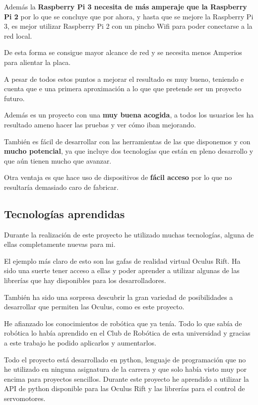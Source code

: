 \documentclass[twoside, 11pt]{epstfg}
\begin{document}
Además la \textbf{Raspberry Pi 3 necesita de más amperaje que la Raspberry Pi 2} por lo que se concluye que por ahora, y hasta que se mejore la Raspberry Pi 3, es mejor utilizar Raspberry Pi 2 con un pincho Wifi para poder conectarse a la red local.

De esta forma se consigue mayor alcance de red y se necesita menos Amperios para alientar la placa.

A pesar de todos estos puntos a mejorar el resultado es muy bueno, teniendo e cuenta que e una primera aproximación a lo que que pretende ser un proyecto futuro.

Además es un proyecto con una \textbf{muy buena acogida}, a todos los usuarios les ha resultado ameno hacer las pruebas y ver cómo iban mejorando.

También es fácil de desarrollar con las herramientas de las que disponemos y con \textbf{mucho potencial}, ya que incluye dos tecnologías que están en pleno desarrollo y que aún tienen mucho que avanzar.

Otra ventaja es que hace uso de dispositivos de \textbf{fácil acceso} por lo que no resultaría demasiado caro de fabricar.

\subsection{Tecnologías aprendidas}

Durante la realización de este proyecto he utilizado muchas tecnologías, alguna de ellas completamente nuevas para mi.

El ejemplo más claro de esto son las gafas de realidad virtual Oculus Rift. Ha sido una suerte tener acceso a ellas y poder aprender a utilizar algunas de las librerías que hay disponibles para los desarrolladores.

También ha sido una sorpresa descubrir la gran variedad de posibilidades a desarrollar que permiten las Oculus, como es este proyecto.

He afianzado los conocimientos de robótica que ya tenía. Todo lo que sabía de robótica lo había aprendido en el Club de Robótica de esta universidad y gracias a este trabajo he podido aplicarlos y aumentarlos.

Todo el proyecto está desarrollado en python, lenguaje de programación que no he utilizado en ninguna asignatura de la carrera y que solo había visto muy por encima para proyectos sencillos.
Durante este proyecto he aprendido a utilizar la API de python disponible para las Oculus Rift y las librerías para el control de servomotores.
\end{document}
